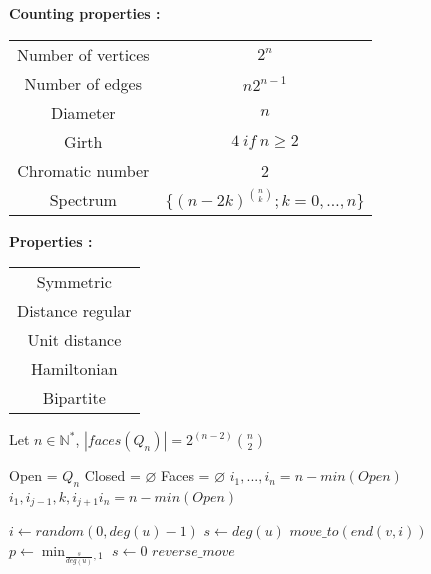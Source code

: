 \begin{minipage}{0.49\textwidth}
 \begin{center}
 \textbf{Counting properties :}\\
 \begin{tabular}{|c|c|}
  \hline
    Number of vertices & $2^{n}$\\
    Number of edges & $n2^{n-1}$\\
    Diameter & $n$\\
    Girth & $4\ if\ n \geq 2$\\
    Chromatic number & 2\\
    Spectrum 	& ${\displaystyle \{(n-2k)^{\binom {n}{k}};k=0,\ldots ,n\}}$\\
  \hline
  \end{tabular}
  \end{center}
\end{minipage}
\begin{minipage}{0.49\textwidth}
 \begin{center}
  \textbf{Properties :}\\
 \begin{tabular}{|c|}
  \hline
  Symmetric\\
  Distance regular\\
  Unit distance\\
  Hamiltonian\\
  Bipartite\\
  \hline
  \end{tabular}
  \end{center}
\end{minipage}

\begin{lemma}
 Let $n \in \mathbb{N}^{*}$, $|faces(Q_{n})| = 2^{(n-2)}\binom{n}{2}$
\end{lemma}


\begin{algorithmic}
    \State Open = $Q_{n}$
    \State Closed =  $\varnothing$
    \State Faces = $\varnothing$
      \State $i_{1}, ..., i_{n} = n-min( Open )$
	\State $i_{1}, i_{j-1}, k, i_{j+1} i_{n} = n-min( Open )$
      \EndFor
      \State $ $
    \EndWhile

    \State $i\gets random(0, deg(u)-1)$
    \State $s \gets deg(u)$
    \State $move\_to( end(v,i) )$
       \Else
    \State $p \gets \min_{ \frac{s}{deg(u)}, 1}$
      \State $s \gets 0$
    \Else
      \State $reverse\_move$
    \EndIf
      \EndIf
 \end{algorithmic}

